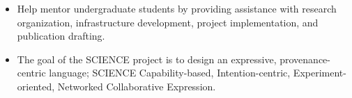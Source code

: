 \documentclass[10pt]{article}
\newcommand{\tabularxwidth}{\textwidth}
\begin{document}
\begin{minipage}{\tabularxwidth}
\begin{itemize}[noitemsep, topsep=3pt, parsep=0pt, partopsep=0pt]
                \item 
    Help mentor undergraduate students by providing assistance with research organization, infrastructure development, project implementation, and publication drafting.
            
                \item 
    The goal of the SCIENCE project is to design an expressive, provenance-centric language; SCIENCE Capability-based, Intention-centric, Experiment-oriented, Networked Collaborative Expression.
            
        \end{itemize}

        
            \vspace{.5em}
        

    \end{minipage}
    
\end{document}
